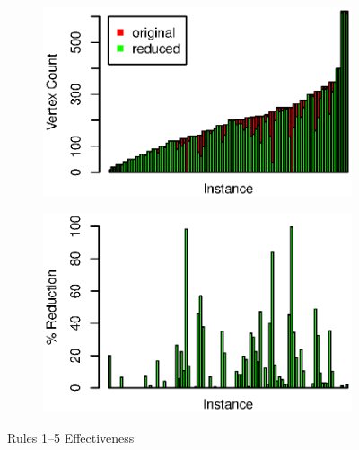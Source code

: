 \documentclass[12pt,oneside,english,parskip=full,headings=small]{scrbook}
\theoremstyle{definition}
\begin{document}
\begin{figure}[h]
	\begin{subfigure}{0.49\textwidth}
		\includegraphics[width=1.0\linewidth]{rules1-5_absolute}
	\end{subfigure}
	\begin{subfigure}{0.49\textwidth}
		\includegraphics[width=1.0\linewidth]{rules1-5_percent}
	\end{subfigure}
	\caption{Rules 1--5 Effectiveness}
	\label{fig:rules1-5 eff}
\end{figure}
\end{document}

